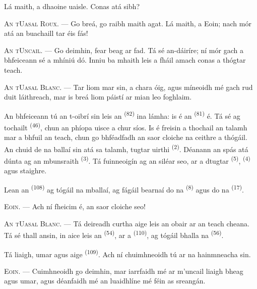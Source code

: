 Lá maith, a dhaoine uaisle. Conas atá sibh?

\textsc{An tUasal Roux}. --- Go breá, go raibh maith agat. Lá maith, a Eoin; nach
mór atá an buachaill tar éis fás!

\textsc{An tUncail}. --- Go deimhin, fear beag ar fad. Tá sé an-dáiríre; ní mór
gach a bhfeiceann sé a mhíniú dó. Inniu ba mhaith leis a fháil amach conas a
thógtar teach.

\VUsaut{3.0mm}

\textsc{An tUasal Blanc}. --- Tar liom mar sin, a chara óig, agus míneoidh mé gach
rud duit láithreach, mar is breá liom páistí ar mian leo foghlaim.

An bhfeiceann tú an t-oibrí sin leis an 
\textsuperscript{(82)} ina lámha: is é an 
\textsuperscript{(81)} é. Tá sé ag tochailt  \textsuperscript{(46)},
chun an phíopa uisce a chur síos. Is é freisin a thochail an talamh mar a bhfuil an
teach, chun go bhféadfadh an saor cloiche na ceithre  a thógáil. An
chuid de na ballaí sin atá sa talamh, tugtar  uirthi
\textsuperscript{(2)}. Déanann an spás atá dúnta ag an mbunsraith
 \textsuperscript{(3)}. Tá fuinneoigín ag an siléar seo, ar a
dtugtar  \textsuperscript{(5)}, 
\textsuperscript{(4)} agus staighre.

Lean an  \textsuperscript{(108)} ag tógáil na mballaí, ag
fágáil bearnaí do na  \textsuperscript{(8)} agus do na
 \textsuperscript{(17)}.

\textsc{Eoin}. --- Ach ní fheicim é, an saor cloiche seo!

\textsc{An tUasal Blanc}. --- Tá deireadh curtha aige leis an obair ar an teach
cheana. Tá sé thall ansin, in aice leis an 
\textsuperscript{(54)}, ar a  \textsuperscript{(110)}, ag tógáil
bhalla na  \textsuperscript{(56)}.

Tá liaigh, umar agus  aige \textsuperscript{(109)}. Ach ní
chuimhneoidh tú ar na hainmneacha sin.

\textsc{Eoin}. --- Cuimhneoidh go deimhin, mar iarrfaidh mé ar m'uncail liaigh
bheag agus umar, agus déanfaidh mé an luaidhlíne mé féin as sreangán.

